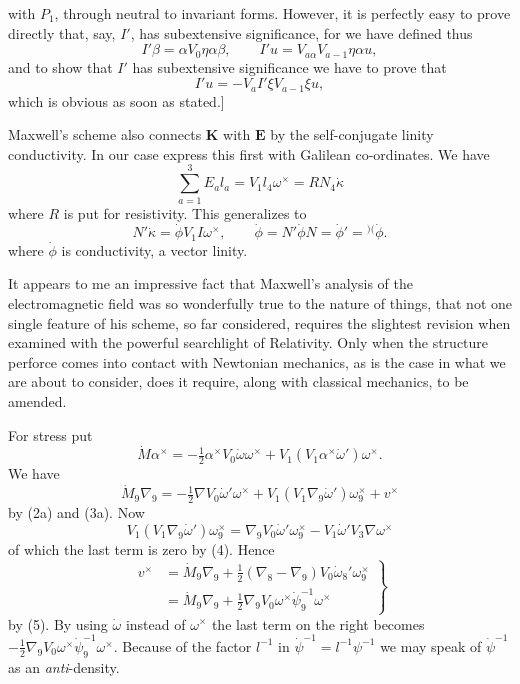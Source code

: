 \documentclass[11pt]{article}
\newcommand{\markpair}[3]{{}^{#1#2}#3}
\begin{document}
with $P_1$, through neutral to invariant forms. However, it is perfectly easy to prove directly that, say, $I'$, has subextensive significance, for we have defined thus
\[
  I'\beta=\alpha V_0\eta\alpha\beta,\qquad I'u=V_{a\alpha}V_{a-1}\eta\alpha u,
\]
and to show that $I'$ has subextensive significance we have to prove that
\[
  I'u=-V_aI'\xi V_{a-1}\xi u,
\]
which is obvious as soon as stated.]

\indent Maxwell's scheme also connects $\mathbf{K}$ with $\mathbf{E}$ by the self-conjugate linity conductivity. In our case express this first with Galilean co-ordinates. We have
\[
  \sum_{a=1}^{3}E_al_a=V_1l_4\omega^\times=RN_4\dot\kappa
\]
where $R$ is put for resistivity. This generalizes to
\begin{equation}
  N'\dot\kappa=\dot\phi V_1I\omega^\times,\qquad
  \dot\phi=N'\dot\phi N=\dot\phi'=\markpair{)}{(}{\dot\phi}.
  \tag{7}
\end{equation}
where $\dot\phi$ is conductivity, a vector linity.

\indent It appears to me an impressive fact that Maxwell's analysis of the electromagnetic field was so wonderfully true to the nature of things, that not one single feature of his scheme, so far considered, requires the slightest revision when examined with the powerful searchlight of Relativity. Only when the structure perforce comes into contact with Newtonian mechanics, as is the case in what we are about to consider, does it require, along with classical mechanics, to be amended.

\indent For stress put
\begin{equation}
  \dot M\alpha^\times=-\tfrac12\alpha^\times V_0\dot\omega\omega^\times+V_1(V_1\alpha^\times\dot\omega')\omega^\times.
  \tag{8}
\end{equation}
We have
\[
  \dot M_9\nabla_9=-\tfrac12\nabla V_0\dot\omega'\omega^\times+V_1(V_1\nabla_9\dot\omega')\omega_9^\times+v^\times
\]
by (2a) and (3a). Now
\[
  V_1(V_1\nabla_9\dot\omega')\omega_9^\times
  =\nabla_9V_0\dot\omega'\omega_9^\times-V_1\dot\omega'V_3\nabla\omega^\times
\]
of which the last term is zero by (4). Hence
\begin{equation}
  \left.\begin{aligned}
    v^\times&=\dot M_9\nabla_9+\tfrac12(\nabla_8-\nabla_9)V_0\dot\omega_8'\omega_9^\times\\
    &=\dot M_9\nabla_9+\tfrac12\nabla_9V_0\omega^\times\dot\psi_9^{-1}\omega^\times
  \end{aligned}\right\}
  \tag{9}
\end{equation}
by (5). By using $\dot\omega$ instead of $\omega^\times$ the last term on the right becomes $-\tfrac12\nabla_9V_0\omega^\times\dot\psi_9^{-1}\omega^\times$. Because of the factor $l^{-1}$ in $\dot\psi^{-1}=l^{-1}\psi^{-1}$ we may speak of $\dot\psi^{-1}$ as an \emph{anti}-density.
\end{document}
